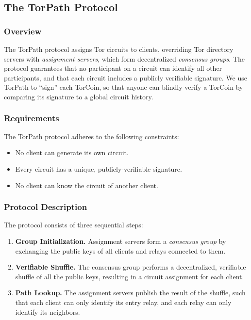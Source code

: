 \subsection{The TorPath Protocol}

\subsubsection{Overview}

The TorPath protocol assigns Tor circuits to clients, overriding Tor directory servers with \textit{assignment servers}, which form decentralized \textit{consensus groups}. The protocol guarantees that no participant on a circuit can identify all other participants, and that each circuit includes a publicly verifiable signature. We use TorPath to ``sign'' each TorCoin, so that anyone can blindly verify a TorCoin by comparing its signature to a global circuit history.

\subsubsection{Requirements}

The TorPath protocol adheres to the following constraints:

\begin{itemize}   
\item No client can generate its own circuit.
\item Every circuit has a unique, publicly-verifiable signature.
\item No client can know the circuit of another client.
\end{itemize}

\subsubsection{Protocol Description}

The protocol consists of three sequential steps:

\begin{enumerate}
\item \textbf{Group Initialization.} Assignment servers form a \textit{consensus group} by exchanging the public keys of all clients and relays connected to them. 
\item \textbf{Verifiable Shuffle.} The consensus group performs a decentralized, 
verifiable shuffle of all the public keys, resulting in a circuit assignment for
each client.
\item \textbf{Path Lookup.} The assignment servers publish the result of the 
shuffle, such that each client can only identify its entry relay, and each relay
can only identify its neighbors. 
\end{enumerate}


